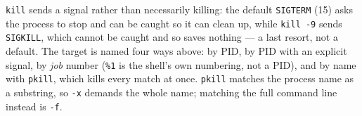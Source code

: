 
\texttt{kill} sends a signal rather than necessarily killing: the default
\texttt{SIGTERM} (15) asks the process to stop and can be caught so it can clean
up, while \texttt{kill -9} sends \texttt{SIGKILL}, which cannot be caught and so
saves nothing --- a last resort, not a default. The target is named four ways
above: by PID, by PID with an explicit signal, by \emph{job} number
(\texttt{\%1} is the shell's own numbering, not a PID), and by name with
\texttt{pkill}, which kills every match at once. \texttt{pkill} matches the
process name as a substring, so \texttt{-x} demands the whole name; matching the
full command line instead is \texttt{-f}.
